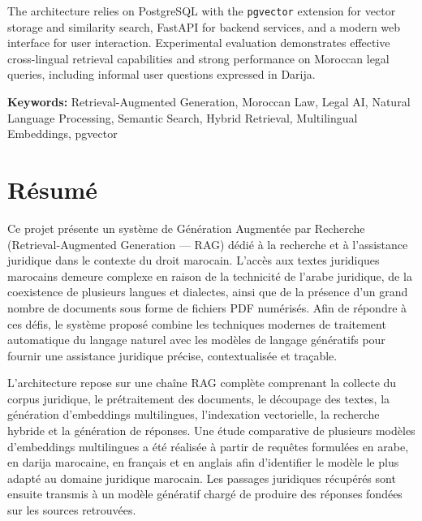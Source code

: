 \documentclass[12pt,a4paper]{report}
\begin{document}
The architecture relies on PostgreSQL with the \texttt{pgvector} extension for vector storage and similarity search, FastAPI for backend services, and a modern web interface for user interaction. Experimental evaluation demonstrates effective cross-lingual retrieval capabilities and strong performance on Moroccan legal queries, including informal user questions expressed in Darija.

\vspace{0.5cm}

\noindent\textbf{Keywords:} Retrieval-Augmented Generation, Moroccan Law, Legal AI, Natural Language Processing, Semantic Search, Hybrid Retrieval, Multilingual Embeddings, pgvector

\clearpage

\chapter*{Résumé}

Ce projet présente un système de Génération Augmentée par Recherche (Retrieval-Augmented Generation --- RAG) dédié à la recherche et à l'assistance juridique dans le contexte du droit marocain. L'accès aux textes juridiques marocains demeure complexe en raison de la technicité de l'arabe juridique, de la coexistence de plusieurs langues et dialectes, ainsi que de la présence d'un grand nombre de documents sous forme de fichiers PDF numérisés. Afin de répondre à ces défis, le système proposé combine les techniques modernes de traitement automatique du langage naturel avec les modèles de langage génératifs pour fournir une assistance juridique précise, contextualisée et traçable.

L'architecture repose sur une chaîne RAG complète comprenant la collecte du corpus juridique, le prétraitement des documents, le découpage des textes, la génération d'embeddings multilingues, l'indexation vectorielle, la recherche hybride et la génération de réponses. Une étude comparative de plusieurs modèles d'embeddings multilingues a été réalisée à partir de requêtes formulées en arabe, en darija marocaine, en français et en anglais afin d'identifier le modèle le plus adapté au domaine juridique marocain. Les passages juridiques récupérés sont ensuite transmis à un modèle génératif chargé de produire des réponses fondées sur les sources retrouvées.
\end{document}
